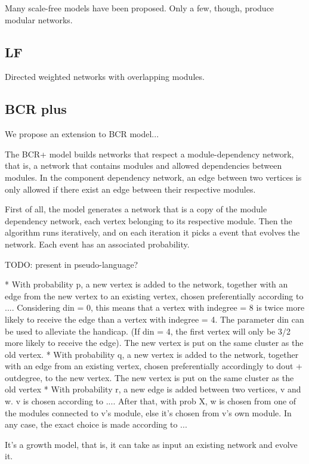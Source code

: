 Many scale-free models have been proposed. Only a few, though, produce modular
networks. 

\subsection{LF}

Directed weighted networks with overlapping modules.

\subsection{BCR plus}

We propose an extension to BCR model...

The BCR+ model builds networks that respect a module-dependency network, that
is, a network that contains modules and allowed dependencies between modules. 
In the component dependency network, an edge between two vertices is only
allowed if there exist an edge between their respective modules.

First of all, the model generates a network that is a copy of the module
dependency network, each vertex belonging to its respective module. Then the
algorithm runs iteratively, and on each iteration it picks a event that evolves
the network. Each event has an associated probability.

TODO: present in pseudo-language?

* With probability p, a new vertex is added to the network, together with an
edge from the new vertex to an existing vertex, chosen preferentially according
to .... Considering din = 0, this means that a vertex with indegree = 8 is
twice more likely to receive the edge than a vertex with indegree = 4. The
parameter din can be used to alleviate the handicap. (If din = 4, the first
vertex will only be 3/2 more likely to receive the edge). The new vertex is
put on the same cluster as the old vertex.
* With probability q, a new vertex is added to the network, together with an
edge from an existing vertex, chosen preferentially accordingly to dout +
outdegree, to the new vertex. The new vertex is put on the same cluster as the
old vertex
* With probability r, a new edge is added between two vertices, v and w. v is
chosen according to .... After that, with prob X, w is chosen from one of the
modules connected to v's module, else it's chosen from v's own module. In any
case, the exact choice is made according to ...

It's a growth model, that is, it can take as input an existing network and
evolve it.

